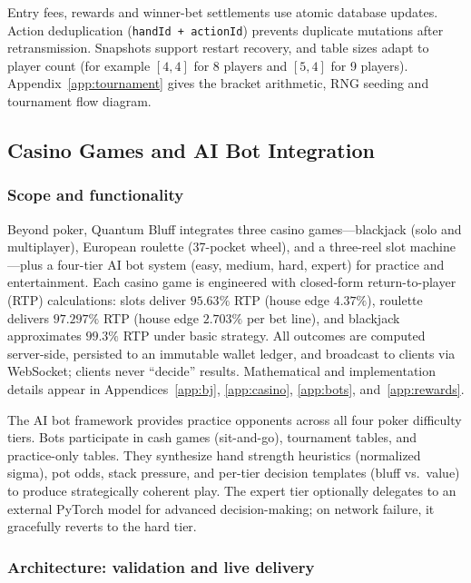 \documentclass[11pt,a4paper]{article}
\begin{document}
Entry fees, rewards and winner-bet settlements use atomic database updates. Action deduplication (\texttt{handId + actionId}) prevents duplicate mutations after retransmission. Snapshots support restart recovery, and table sizes adapt to player count (for example $[4,4]$ for 8 players and $[5,4]$ for 9 players). Appendix~\ref{app:tournament} gives the bracket arithmetic, RNG seeding and tournament flow diagram.

\subsection{Casino Games and AI Bot Integration}
\label{sec:casino-ai}

\subsubsection{Scope and functionality}

Beyond poker, Quantum Bluff integrates three casino games---blackjack (solo and multiplayer), European roulette (37-pocket wheel), and a three-reel slot machine---plus a four-tier AI bot system (easy, medium, hard, expert) for practice and entertainment. Each casino game is engineered with closed-form return-to-player (RTP) calculations: slots deliver $95.63\%$ RTP (house edge $4.37\%$), roulette delivers $97.297\%$ RTP (house edge $2.703\%$ per bet line), and blackjack approximates $99.3\%$ RTP under basic strategy. All outcomes are computed server-side, persisted to an immutable wallet ledger, and broadcast to clients via WebSocket; clients never ``decide'' results. Mathematical and implementation details appear in Appendices~\ref{app:bj}, \ref{app:casino}, \ref{app:bots}, and~\ref{app:rewards}.

The AI bot framework provides practice opponents across all four poker difficulty tiers. Bots participate in cash games (sit-and-go), tournament tables, and practice-only tables. They synthesize hand strength heuristics (normalized sigma), pot odds, stack pressure, and per-tier decision templates (bluff vs.\ value) to produce strategically coherent play. The expert tier optionally delegates to an external PyTorch model for advanced decision-making; on network failure, it gracefully reverts to the hard tier.

\subsubsection{Architecture: validation and live delivery}
\end{document}
